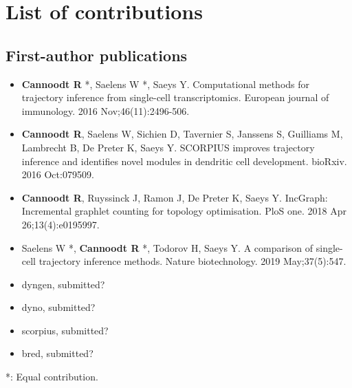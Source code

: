 \section{List of contributions}

\subsection{First-author publications}

\begin{itemize}
	\item \textbf{Cannoodt R} *, Saelens W *, Saeys Y. Computational methods for trajectory inference from single-cell transcriptomics. European journal of immunology. 2016 Nov;46(11):2496-506.
	\item \textbf{Cannoodt R}, Saelens W, Sichien D, Tavernier S, Janssens S, Guilliams M, Lambrecht B, De Preter K, Saeys Y. SCORPIUS improves trajectory inference and identifies novel modules in dendritic cell development. bioRxiv. 2016 Oct:079509.
	\item \textbf{Cannoodt R}, Ruyssinck J, Ramon J, De Preter K, Saeys Y. IncGraph: Incremental graphlet counting for topology optimisation. PloS one. 2018 Apr 26;13(4):e0195997.
  \item Saelens W *, \textbf{Cannoodt R} *, Todorov H, Saeys Y. A comparison of single-cell trajectory inference methods. Nature biotechnology. 2019 May;37(5):547.
  \item dyngen, submitted?
  \item dyno, submitted?
  \item scorpius, submitted?
  \item bred, submitted?
 \end{itemize}

*: Equal contribution.

